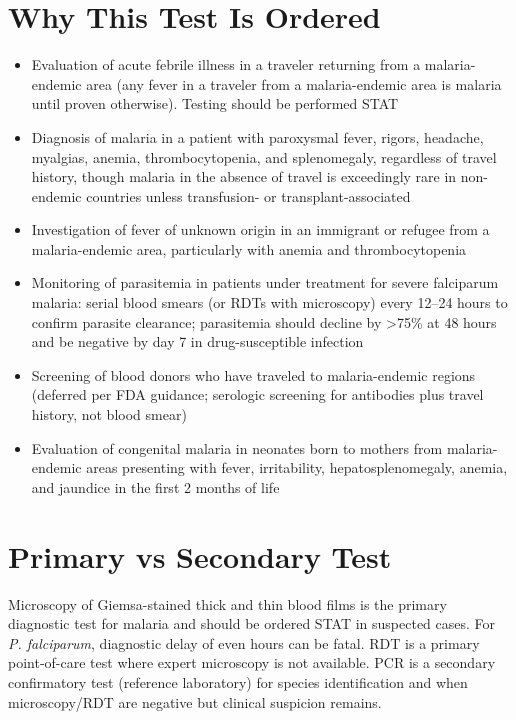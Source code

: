 \section*{Why This Test Is Ordered}
\begin{itemize}
  \item Evaluation of acute febrile illness in a traveler returning from a malaria-endemic area (any fever in a traveler from a malaria-endemic area is malaria until proven otherwise). Testing should be performed STAT
  \item Diagnosis of malaria in a patient with paroxysmal fever, rigors, headache, myalgias, anemia, thrombocytopenia, and splenomegaly, regardless of travel history, though malaria in the absence of travel is exceedingly rare in non-endemic countries unless transfusion- or transplant-associated
  \item Investigation of fever of unknown origin in an immigrant or refugee from a malaria-endemic area, particularly with anemia and thrombocytopenia
  \item Monitoring of parasitemia in patients under treatment for severe falciparum malaria: serial blood smears (or RDTs with microscopy) every 12--24 hours to confirm parasite clearance; parasitemia should decline by >75\% at 48 hours and be negative by day 7 in drug-susceptible infection
  \item Screening of blood donors who have traveled to malaria-endemic regions (deferred per FDA guidance; serologic screening for antibodies plus travel history, not blood smear)
  \item Evaluation of congenital malaria in neonates born to mothers from malaria-endemic areas presenting with fever, irritability, hepatosplenomegaly, anemia, and jaundice in the first 2 months of life
\end{itemize}

\section*{Primary vs Secondary Test}
Microscopy of Giemsa-stained thick and thin blood films is the primary diagnostic test for malaria and should be ordered STAT in suspected cases. For \textit{P. falciparum}, diagnostic delay of even hours can be fatal. RDT is a primary point-of-care test where expert microscopy is not available. PCR is a secondary confirmatory test (reference laboratory) for species identification and when microscopy/RDT are negative but clinical suspicion remains.

